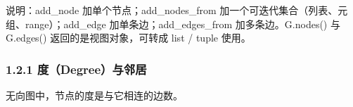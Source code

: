 \begin{Shaded}
\begin{Highlighting}[]

\OperatorTok{=}

\NormalTok{)}
\NormalTok{G.add\_nodes\_from([}\NormalTok{, }\NormalTok{, }\NormalTok{])}

\NormalTok{, }\NormalTok{)}
\NormalTok{G.add\_edges\_from([(}\NormalTok{, }\NormalTok{), (}\NormalTok{, }\NormalTok{), (}\NormalTok{, }\NormalTok{)])}

\end{Highlighting}
\end{Shaded}

\begin{Shaded}
\begin{Highlighting}[]
\NormalTok{[1, 2, 3, 4]}
\NormalTok{[(1, 2), (1, 4), (2, 3), (3, 4)]}
\end{Highlighting}
\end{Shaded}

说明：add\_node 加单个节点；add\_nodes\_from
加一个可迭代集合（列表、元组、range）；add\_edge
加单条边；add\_edges\_from 加多条边。G.nodes() 与 G.edges()
返回的是视图对象，可转成 list / tuple 使用。

\subsubsection{1.2.1
度（Degree）与邻居}\label{ux5ea6degreeux4e0eux90bbux5c45}

无向图中，节点的度是与它相连的边数。

\begin{Shaded}
\begin{Highlighting}[]
    \NormalTok{(}\SpecialCharTok{\{}\SpecialCharTok{\}}\SpecialCharTok{\{}\SpecialCharTok{\}}\NormalTok{)}
\NormalTok{(}\NormalTok{)))       }
\end{Highlighting}
\end{Shaded}

